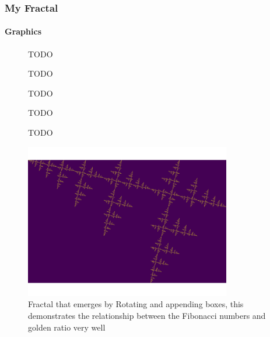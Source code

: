 \documentclass[11pt]{article}
\begin{document}
\subsubsection{My Fractal}
\label{sec:orgc85f86d}
\paragraph{Graphics}
\label{sec:orgbaec281}

\begin{figure}[htbp]
\centering

\caption{\label{My-Frac-GR}TODO}
\end{figure}

\begin{figure}[htbp]
\centering

\caption{\label{My-Frac-GR}TODO}
\end{figure}

\begin{figure}[htbp]
\centering

\caption{\label{My-Frac-GR}TODO}
\end{figure}

\begin{figure}[htbp]
\centering

\caption{\label{My-Frac-GR}TODO}
\end{figure}

\begin{figure}[htbp]
\centering

\caption{\label{My-Frac-GR}TODO}
\end{figure}

\begin{figure}[htbp]
\centering
\includegraphics[width=9cm]{../Problems/fractal-dimensions/my-self-rep-frac-GR.png}
\caption{\label{My-Frac-GR}Fractal that emerges by Rotating and appending boxes, this demonstrates the relationship between the Fibonacci numbers and golden ratio very well}
\end{figure}
\end{document}

